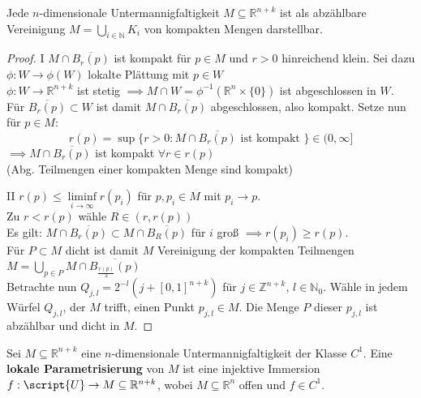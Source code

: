 
  \begin{theorem}
    Jede $n$-dimensionale Untermannigfaltigkeit $M \subseteq \mathbb{R}^{n+k}$ ist als abzählbare Vereinigung $M = \bigcup\limits_{i\in\mathbb{N}} K_i$ von kompakten Mengen darstellbar.
  \end{theorem}

  \begin{proof}
    \item[I] $M\cap \overline{B_r(p)}$ ist kompakt für $p\in M$ und $r>0$ hinreichend klein. Sei dazu $\phi: W\to \phi(W)$ lokalte Plättung mit $p\in W$ \\
    $\phi: W\to \mathbb{R}^{n+k}$ ist stetig $\implies M\cap W = \phi^{-1}(\mathbb{R}^n\times\{0\})$ ist abgeschlossen in $W$. Für $\overline{B_r(p)}\subset W$ ist damit $M\cap \overline{B_r(p)}$ abgeschlossen, also kompakt. Setze nun für $p\in M$:  
    $$ r(p) = \sup\{r >0: M\cap \overline{B_r(p)} \text{ ist kompakt } \} \in (0,\infty] $$
    $\implies M\cap \overline{B_r(p)}$ ist kompakt $\forall r\in r(p)$ \\
    (Abg. Teilmengen einer kompakten Menge sind kompakt)
    \item[II] $r(p) \leq \liminf\limits_{i\to\infty}r(p_i)$ für $p,p_i\in M$ mit $p_i \to p$. \\
    Zu $r < r(p)$ wähle $R\in (r, r(p))$ \\
    Es gilt: $M\cap \overline{B_r(p)} \subset M\cap \overline{B_R(p)}$ für $i$ groß $\implies r(p_i) \geq r(p)$. \\
    Für $P\subset M$ dicht ist damit $M$ Vereinigung der kompakten Teilmengen \\ $M = \bigcup\limits_{p\in P} M\cap \overline{B_{\frac{r(p)}{2}}(p)}$ \\
    Betrachte nun $Q_{j,l} = 2^{-l} (j+[0,1]^{n+k})$ für $j\in \mathbb{Z}^{n+k}$, $l\in\mathbb{N}_0$. Wähle in jedem Würfel $Q_{j,l}$, der $M$ trifft, einen Punkt $p_{j,l}\in M$. Die Menge $P$ dieser $p_{j,l}$ ist abzählbar und dicht in $M$. 
  \end{proof}

  \begin{definition}
    Sei $M \subseteq \mathbb{R}^{n+k}$ eine $n$-dimensionale Untermannigfaltigkeit der Klasse $C^1$. Eine \textbf{lokale Parametrisierung} von $M$ ist eine injektive Immersion $f: \script{U} \to M \subseteq \mathbb{R}^{n+k}$, wobei $M \subseteq \mathbb{R}^n$ offen und $f \in C^1$.
  \end{definition}

